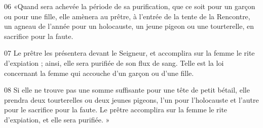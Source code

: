
06 «Quand sera achevée la période de sa purification, que ce soit pour un garçon ou pour une fille, elle amènera au prêtre, à l’entrée de la tente de la Rencontre, un agneau de l’année pour un holocauste, un jeune pigeon ou une tourterelle, en sacrifice pour la faute.

07 Le prêtre les présentera devant le Seigneur, et accomplira sur la femme le rite d’expiation ; ainsi, elle sera purifiée de son flux de sang. Telle est la loi concernant la femme qui accouche d’un garçon ou d’une fille.

08 Si elle ne trouve pas une somme suffisante pour une tête de petit bétail, elle prendra deux tourterelles ou deux jeunes pigeons, l’un pour l’holocauste et l’autre pour le sacrifice pour la faute. Le prêtre accomplira sur la femme le rite d’expiation, et elle sera purifiée. »